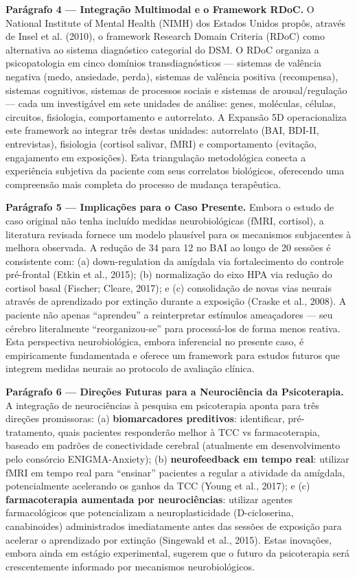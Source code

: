 \documentclass[12pt,a4paper]{article}
\begin{document}
\textbf{Parágrafo 4 — Integração Multimodal e o Framework RDoC.} O National Institute of Mental Health (NIMH) dos Estados Unidos propôs, através de Insel et al. (2010), o framework Research Domain Criteria (RDoC) como alternativa ao sistema diagnóstico categorial do DSM. O RDoC organiza a psicopatologia em cinco domínios transdiagnósticos --- sistemas de valência negativa (medo, ansiedade, perda), sistemas de valência positiva (recompensa), sistemas cognitivos, sistemas de processos sociais e sistemas de arousal/regulação --- cada um investigável em sete unidades de análise: genes, moléculas, células, circuitos, fisiologia, comportamento e autorrelato. A Expansão 5D operacionaliza este framework ao integrar três destas unidades: autorrelato (BAI, BDI-II, entrevistas), fisiologia (cortisol salivar, fMRI) e comportamento (evitação, engajamento em exposições). Esta triangulação metodológica conecta a experiência subjetiva da paciente com seus correlatos biológicos, oferecendo uma compreensão mais completa do processo de mudança terapêutica.

\textbf{Parágrafo 5 — Implicações para o Caso Presente.} Embora o estudo de caso original não tenha incluído medidas neurobiológicas (fMRI, cortisol), a literatura revisada fornece um modelo plausível para os mecanismos subjacentes à melhora observada. A redução de 34 para 12 no BAI ao longo de 20 sessões é consistente com: (a) down-regulation da amígdala via fortalecimento do controle pré-frontal (Etkin et al., 2015); (b) normalização do eixo HPA via redução do cortisol basal (Fischer; Cleare, 2017); e (c) consolidação de novas vias neurais através de aprendizado por extinção durante a exposição (Craske et al., 2008). A paciente não apenas ``aprendeu'' a reinterpretar estímulos ameaçadores --- seu cérebro literalmente ``reorganizou-se'' para processá-los de forma menos reativa. Esta perspectiva neurobiológica, embora inferencial no presente caso, é empiricamente fundamentada e oferece um framework para estudos futuros que integrem medidas neurais ao protocolo de avaliação clínica.

\textbf{Parágrafo 6 — Direções Futuras para a Neurociência da Psicoterapia.} A integração de neurociências à pesquisa em psicoterapia aponta para três direções promissoras: (a) \textbf{biomarcadores preditivos}: identificar, pré-tratamento, quais pacientes responderão melhor à TCC vs farmacoterapia, baseado em padrões de conectividade cerebral (atualmente em desenvolvimento pelo consórcio ENIGMA-Anxiety); (b) \textbf{neurofeedback em tempo real}: utilizar fMRI em tempo real para ``ensinar'' pacientes a regular a atividade da amígdala, potencialmente acelerando os ganhos da TCC (Young et al., 2017); e (c) \textbf{farmacoterapia aumentada por neurociências}: utilizar agentes farmacológicos que potencializam a neuroplasticidade (D-cicloserina, canabinoides) administrados imediatamente antes das sessões de exposição para acelerar o aprendizado por extinção (Singewald et al., 2015). Estas inovações, embora ainda em estágio experimental, sugerem que o futuro da psicoterapia será crescentemente informado por mecanismos neurobiológicos.
\end{document}
